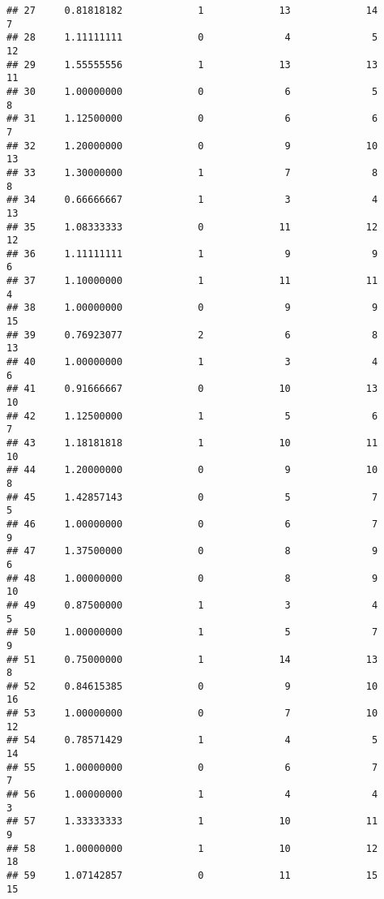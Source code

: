 \documentclass[
]{article}
\begin{document}
\begin{verbatim}
## 27     0.81818182             1             13             14              7
## 28     1.11111111             0              4              5             12
## 29     1.55555556             1             13             13             11
## 30     1.00000000             0              6              5              8
## 31     1.12500000             0              6              6              7
## 32     1.20000000             0              9             10             13
## 33     1.30000000             1              7              8              8
## 34     0.66666667             1              3              4             13
## 35     1.08333333             0             11             12             12
## 36     1.11111111             1              9              9              6
## 37     1.10000000             1             11             11              4
## 38     1.00000000             0              9              9             15
## 39     0.76923077             2              6              8             13
## 40     1.00000000             1              3              4              6
## 41     0.91666667             0             10             13             10
## 42     1.12500000             1              5              6              7
## 43     1.18181818             1             10             11             10
## 44     1.20000000             0              9             10              8
## 45     1.42857143             0              5              7              5
## 46     1.00000000             0              6              7              9
## 47     1.37500000             0              8              9              6
## 48     1.00000000             0              8              9             10
## 49     0.87500000             1              3              4              5
## 50     1.00000000             1              5              7              9
## 51     0.75000000             1             14             13              8
## 52     0.84615385             0              9             10             16
## 53     1.00000000             0              7             10             12
## 54     0.78571429             1              4              5             14
## 55     1.00000000             0              6              7              7
## 56     1.00000000             1              4              4              3
## 57     1.33333333             1             10             11              9
## 58     1.00000000             1             10             12             18
## 59     1.07142857             0             11             15             15

\end{verbatim}
\end{document}
